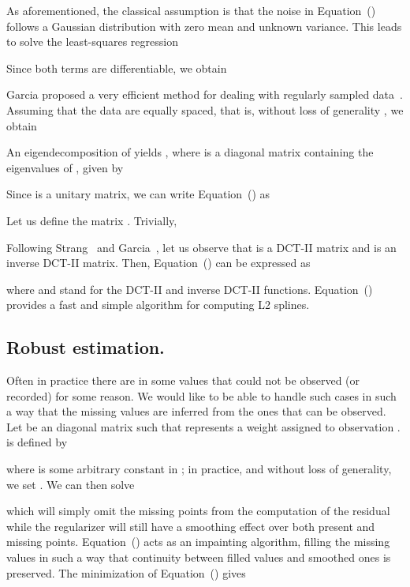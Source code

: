 \documentclass[preprint]{imsart}
\begin{document}
As aforementioned, the classical assumption is that the noise  in Equation~() follows a Gaussian distribution with zero mean and unknown variance. This leads to solve the least-squares regression

Since both terms are differentiable, we obtain


Garcia proposed a very efficient method for dealing with regularly sampled data~\cite{garcia10}. Assuming that the data are equally spaced, that is, without loss of generality , we obtain

An eigendecomposition of  yields , where  is a diagonal matrix containing the eigenvalues of , given by~\cite{yueh05}

Since  is a unitary matrix, we can write Equation~() as

Let us define the matrix . Trivially,

Following Strang~\cite{strang99} and Garcia~\cite{garcia10}, let us observe that  is a DCT-II matrix and  is an inverse DCT-II matrix. Then, Equation~() can be expressed as

where  and  stand for the DCT-II and inverse DCT-II functions. Equation~() provides a fast and simple algorithm for computing L2 splines.

\subsection{Robust estimation.}
\label{sec:robustL2}

Often in practice there are in  some values  that could not be observed (or recorded) for some reason.
We would like to be able to handle such cases in such a way that the missing values are inferred from the ones that can be observed.
Let  be an  diagonal matrix such that  represents a weight assigned to observation .  is defined by

where  is some arbitrary constant in ; in practice, and without loss of generality, we set . We can then solve

which will simply omit the missing points from the computation of the residual while the regularizer will still have a smoothing effect over both present and missing points. Equation~() acts as an impainting algorithm, filling the missing values in such a way that continuity between filled values and smoothed ones is preserved.
The minimization of Equation~() gives
\end{document}
